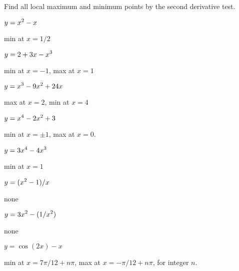 \begin{exercises}
Find all local maximum and minimum points by the second derivative
test. 

\twocol
\begin{exercise} $\displaystyle y=x^2-x$ 
\begin{answer} min at $x=1/2$
\end{answer}\end{exercise}

\begin{exercise} $\displaystyle y=2+3x-x^3$ 
\begin{answer} min at $x=-1$, max at $x=1$
\end{answer}\end{exercise}

\begin{exercise} $\displaystyle y=x^3-9x^2+24x$
\begin{answer} max at $x=2$, min at $x=4$
\end{answer}\end{exercise}

\begin{exercise} $\displaystyle y=x^4-2x^2+3$ 
\begin{answer} min at $x=\pm 1$, max at $x=0$.
\end{answer}\end{exercise}

\begin{exercise} $\displaystyle y=3x^4-4x^3$
\begin{answer} min at $x=1$
\end{answer}\end{exercise}

\begin{exercise} $\displaystyle y=(x^2-1)/x$
\begin{answer} none
\end{answer}\end{exercise}

\begin{exercise} $\displaystyle y=3x^2-(1/x^2)$ 
\begin{answer} none
\end{answer}\end{exercise}

\begin{exercise} $y=\cos(2x)-x$ 
\begin{answer} min at $x=7\pi/12+n\pi$, max at $x=-\pi/12+n\pi$, for integer $n$.
\end{answer}\end{exercise}


\end{exercises}
